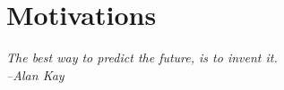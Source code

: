 \section{Motivations}
\begin{small}%
\begin{flushright}%
\it
The best way to predict the future, is to invent it. \\
--Alan Kay
\end{flushright}%
\end{small}%
\vspace{.5cm}